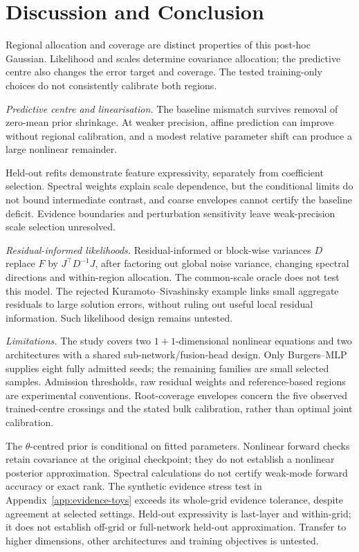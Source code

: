 \section{Discussion and Conclusion}\label{sec:discussion}

Regional allocation and coverage are distinct properties of this post-hoc
Gaussian. Likelihood and scales determine covariance allocation; the predictive
centre also changes the error target and coverage. The tested training-only
choices do not consistently calibrate both regions.

\emph{Predictive centre and linearisation.}
The baseline mismatch survives removal of zero-mean prior shrinkage. At weaker
precision, affine prediction can improve without regional calibration, and a
modest relative parameter shift can produce a large nonlinear remainder.

Held-out refits demonstrate feature expressivity, separately from coefficient
selection. Spectral weights explain scale dependence, but the conditional limits
do not bound intermediate contrast, and coarse envelopes cannot certify the
baseline deficit. Evidence boundaries and perturbation sensitivity leave
weak-precision scale selection unresolved.

\emph{Residual-informed likelihoods.}
Residual-informed or block-wise variances $D$ replace $F$ by $J^\top D^{-1}J$,
after factoring out global noise variance, changing spectral directions and
within-region allocation. The common-scale oracle does not test this model. The
rejected Kuramoto--Sivashinsky example links small aggregate residuals to large
solution errors, without ruling out useful local residual information. Such
likelihood design remains untested.

\emph{Limitations.}
The study covers two $1{+}1$-dimensional nonlinear equations and two architectures with
a shared sub-network/fusion-head design. Only Burgers--MLP supplies eight fully
admitted seeds; the remaining families are small selected samples. Admission thresholds,
raw residual weights and reference-based regions are experimental conventions.
Root-coverage envelopes concern the five observed trained-centre crossings and
the stated bulk calibration, rather than optimal joint calibration.

The $\theta$-centred prior is conditional on fitted parameters. Nonlinear forward
checks retain covariance at the original checkpoint; they do not establish a nonlinear
posterior approximation. Spectral calculations do not certify weak-mode forward accuracy
or exact rank. The synthetic evidence stress test in Appendix~\ref{app:evidence-toys}
exceeds its whole-grid evidence tolerance, despite agreement at selected
settings. Held-out expressivity is last-layer and within-grid;
it does not establish off-grid or full-network held-out approximation. Transfer to
higher dimensions, other architectures and training objectives is untested.

